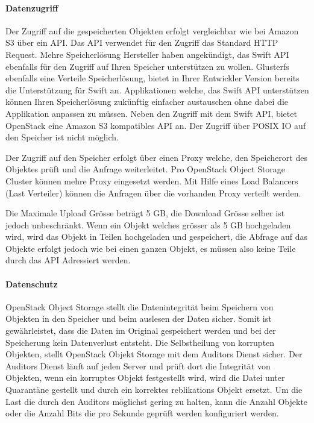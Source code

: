 \paragraph*{Datenzugriff}
Der Zugriff auf die gespeicherten Objekten erfolgt vergleichbar wie bei Amazon S3 über ein API. Das API verwendet für den Zugriff das Standard HTTP Request. Mehre Speicherlösung Hersteller haben angekündigt, das Swift API ebenfalls für den Zugriff auf Ihren Speicher unterstützen zu wollen. Glusterfs ebenfalls eine Verteile Speicherlösung, bietet in Ihrer Entwickler Version bereits die Unterstützung für Swift an. Applikationen welche, das Swift API unterstützen können Ihren Speicherlösung zukünftig einfacher austauschen ohne dabei die Applikation anpassen zu müssen. Neben den Zugriff mit dem Swift API, bietet OpenStack eine Amazon S3 kompatibles API an. Der Zugriff über POSIX IO auf den Speicher ist nicht möglich.

Der Zugriff auf den Speicher erfolgt über einen Proxy welche, den Speicherort des Objektes prüft und die Anfrage weiterleitet. Pro OpenStack Object Storage Cluster können mehre Proxy eingesetzt werden. Mit Hilfe eines Load Balancers (Last Verteiler) können die Anfragen über die vorhanden Proxy verteilt werden.

Die Maximale Upload Grösse beträgt 5 GB, die Download Grösse selber ist jedoch unbeschränkt. Wenn ein Objekt welches grösser als 5 GB hochgeladen wird, wird das Objekt in Teilen hochgeladen und gespeichert, die Abfrage auf das Objekte erfolgt jedoch wie bei einen ganzen Objekt, es müssen also keine Teile durch das API Adressiert werden. \cite{OpenStack2012a}


\paragraph*{Datenschutz}
OpenStack Object Storage stellt die Datenintegrität beim Speichern von Objekten in den Speicher und beim auslesen der Daten sicher. Somit ist gewährleistet, dass die Daten im Original gespeichert werden und bei der Speicherung kein Datenverlust entsteht. Die Selbstheilung von korrupten Objekten, stellt OpenStack Objekt Storage mit dem Auditors Dienst sicher. Der Auditors Dienst läuft auf jeden Server und prüft dort die Integrität von Objekten, wenn ein korruptes Objekt festgestellt wird, wird die Datei unter Quarantäne gestellt und durch ein korrektes reblikations Objekt ersetzt.
Um die Last die durch den Auditors möglichst gering zu halten, kann die Anzahl Objekte oder die Anzahl Bits die pro Sekunde geprüft werden konfiguriert werden. \cite{OpenStack2012}

